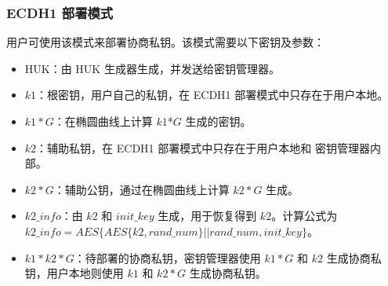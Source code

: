 \documentclass[main\_\_CN.tex]{subfiles}
\begin{document}
\subsubsection{ECDH1 部署模式}

用户可使用该模式来部署协商私钥。该模式需要以下密钥及参数：

\begin{itemize}
    \item HUK：由 HUK 生成器生成，并发送给密钥管理器。
    \item \hyperref[para:k1]{\begin{math}k1\end{math}}：根密钥，用户自己的私钥，在 ECDH1 部署模式中只存在于用户本地。
    \item \hyperref[para:k1G]{\begin{math}k1*G\end{math}}：在椭圆曲线上计算 \hyperref[para:k1]{\begin{math}k1\end{math}}*\begin{math}G\end{math} 生成的密钥。
    \item \hyperref[para:k2]{\begin{math}k2\end{math}}：辅助私钥，在 ECDH1 部署模式中只存在于用户本地和 \chipname{} 密钥管理器内部。
    \item \hyperref[para:k2G]{\begin{math}k2*G\end{math}}：辅助公钥，通过在椭圆曲线上计算 \hyperref[para:k2G]{\begin{math}k2*G\end{math}} 生成。
    \item \hyperref[para:k2info]{\begin{math}k2\_info\end{math}}：由 \hyperref[para:k2]{\begin{math}k2\end{math}} 和 \hyperref[para:initkey]{\begin{math}init\_key\end{math}} 生成，用于恢复得到 \hyperref[para:k2]{\begin{math}k2\end{math}}。计算公式为 \begin{math}k2\_info = AES\{AES\{k2,rand\_num\}||rand\_num,init\_key\}\end{math}。
    \item \hyperref[para:k1k2G]{\begin{math}k1*k2*G\end{math}}：待部署的协商私钥，密钥管理器使用 \hyperref[para:k1G]{\begin{math}k1*G\end{math}} 和 \hyperref[para:k2]{\begin{math}k2\end{math}} 生成协商私钥，用户本地则使用 \hyperref[para:k1]{\begin{math}k1\end{math}} 和 \hyperref[para:k2G]{\begin{math}k2*G\end{math}} 生成协商私钥。

\end{itemize}
\end{document}

